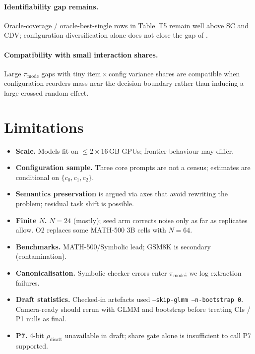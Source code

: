 \documentclass{article}
\newcommand{\pmode}{\pi_{\mathrm{mode}}}
\newcommand{\rdis}{\rho_{\mathrm{disatt}}}
\begin{document}
\paragraph{Identifiability gap remains.}
Oracle-coverage / oracle-best-single rows in Table~T5 remain well above SC and
CDV; configuration diversification alone does not close the gap of
\citet{bay2026modal}.

\paragraph{Compatibility with small interaction shares.}
Large $\pmode$ gaps with tiny item\,$\times$\,config variance shares are
compatible when configuration reorders mass near the decision boundary rather
than inducing a large crossed random effect.

\section{Limitations}
\label{sec:limitations}

\begin{itemize}\itemsep1pt
  \item \textbf{Scale.} Models fit on $\le 2\times$16\,GB GPUs; frontier behaviour
    may differ.
  \item \textbf{Configuration sample.} Three core prompts are not a census;
    estimates are conditional on $\{c_0,c_1,c_2\}$.
  \item \textbf{Semantics preservation} is argued via axes that avoid rewriting
    the problem; residual task shift is possible.
  \item \textbf{Finite $N$.} $N{=}24$ (mostly); seed arm corrects noise only as
    far as replicates allow. O2 replaces some MATH-500 3B cells with $N{=}64$.
  \item \textbf{Benchmarks.} MATH-500/Symbolic lead; GSM8K is secondary
    (contamination).
  \item \textbf{Canonicalisation.} Symbolic checker errors enter $\pmode$; we
    log extraction failures.
  \item \textbf{Draft statistics.} Checked-in artefacts used
    \texttt{--skip-glmm --n-bootstrap 0}. Camera-ready should rerun with GLMM and
    bootstrap before treating CIs / P1 nulls as final.
  \item \textbf{P7.} 4-bit $\rdis$ unavailable in draft; share gate alone is
    insufficient to call P7 supported.
\end{itemize}
\end{document}
